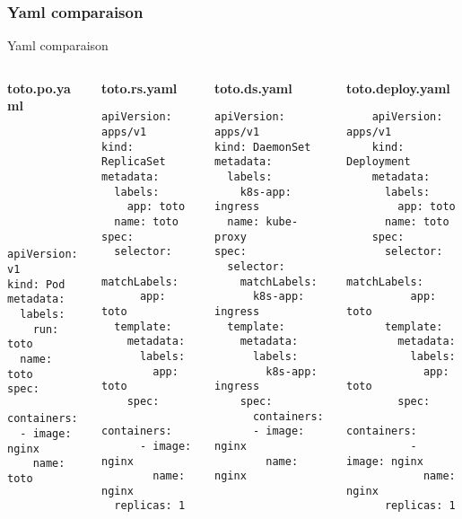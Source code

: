 \subsubsection{Yaml comparaison}
\begin{frame}[fragile]{Yaml comparaison}

\begin{small}
\begin{columns}
  \begin{column}{0.20\linewidth}
    \textbf{toto.po.yaml}
    \begin{lstlisting}








apiVersion: v1
kind: Pod
metadata:
  labels:
    run: toto
  name: toto
spec:
  containers:
  - image: nginx
    name: toto
    \end{lstlisting}
  \end{column}
  \begin{column}{0.27\linewidth}
    \textbf{toto.rs.yaml}
    \begin{lstlisting}
apiVersion: apps/v1
kind: ReplicaSet
metadata:
  labels:
    app: toto
  name: toto
spec:
  selector:
    matchLabels:
      app: toto
  template:
    metadata:
      labels:
        app: toto
    spec:
      containers:
      - image: nginx
        name: nginx
  replicas: 1
  \end{lstlisting}
  \end{column}
  \begin{column}{0.26\linewidth}
    \textbf{toto.ds.yaml}
    \begin{lstlisting}
apiVersion: apps/v1
kind: DaemonSet
metadata:
  labels:
    k8s-app: ingress
  name: kube-proxy
spec:
  selector:
    matchLabels:
      k8s-app: ingress
  template:
    metadata:
      labels:
        k8s-app: ingress
    spec:
      containers:
      - image: nginx
        name: nginx
    \end{lstlisting}
  \end{column}
  \begin{column}{0.27\linewidth}
    \textbf{toto.deploy.yaml}
    \begin{lstlisting}
    apiVersion: apps/v1
    kind: Deployment
    metadata:
      labels:
        app: toto
      name: toto
    spec:
      selector:
        matchLabels:
          app: toto
      template:
        metadata:
          labels:
            app: toto
        spec:
          containers:
          - image: nginx
            name: nginx
      replicas: 1
    \end{lstlisting}
  \end{column}
\end{columns}
\end{small}
\end{frame}
